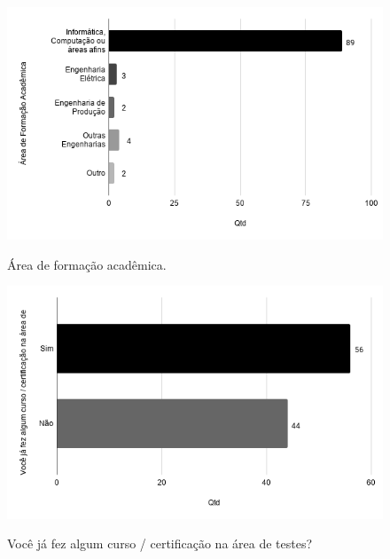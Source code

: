     
        \begin{figure}[!htb]
        \centering
        \includegraphics[width=.80\textwidth]{images/s_areaformacaoacademica.png}
        \label{figure:s_areaformacaoacademica}
        \caption{Área de formação acadêmica.}
        \end{figure}
    
    
        \begin{figure}[!htb]
        \centering
        \includegraphics[width=.80\textwidth]{images/s_certificacao.png}
        \label{figure:s_certificacao}
        \caption{Você já fez algum curso / certificação na área de testes?}
        \end{figure}
    
